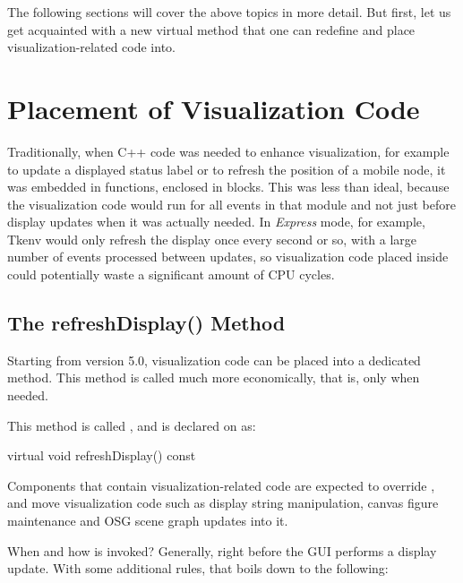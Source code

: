 The following sections will cover the above topics in more detail. But first,
let us get acquainted with a new  virtual method that one
can redefine and place visualization-related code into.


\section{Placement of Visualization Code}
\label{sec:graphics:refreshdisplay}

Traditionally, when C++ code was needed to enhance visualization, for
example to update a displayed status label or to refresh the position of a
mobile node, it was embedded in  functions, enclosed
in  blocks. This was less than ideal, because the
visualization code would run for all events in that module and not just
before display updates when it was actually needed. In \textit{Express} mode,
for example, Tkenv would only refresh the display once every second or so,
with a large number of events processed between updates, so visualization
code placed inside  could potentially waste a
significant amount of CPU cycles.


\subsection{The refreshDisplay() Method}
\label{sec:graphics:refreshdisplay-usage-and-semantics}

Starting from {\opp} version 5.0, visualization code can be placed into a
dedicated method. This method is called much more economically, that is, only
when needed.

This method is called , and is declared on
 as:

\begin{cpp}
virtual void refreshDisplay() const {}
\end{cpp}

Components that contain visualization-related code are expected to override
, and move visualization code such as display string
manipulation, canvas figure maintenance and OSG scene graph updates into it.

When and how is  invoked? Generally, right before
the GUI performs a display update. With some additional rules, that boils
down to the following:

